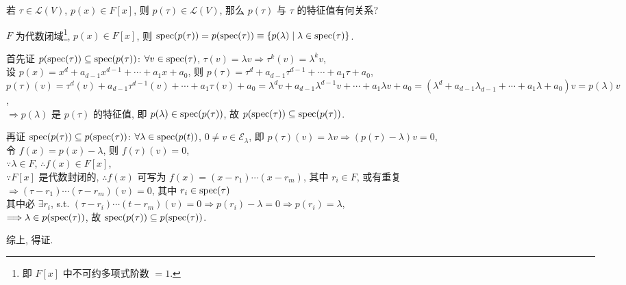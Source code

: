 \documentclass{note}
\begin{document}
若 $\tau\in\mathcal{L}(V)$, $p(x)\in F[x]$, 则 $p(\tau)\in\mathcal{L}(V)$, 那么 $p(\tau)$ 与 $\tau$ 的特征值有何关系?

\begin{thm}
    $F$ 为代数闭域\footnote{即 $F[x]$ 中不可约多项式阶数 $=1$.}, $p(x)\in F[x]$, 则 $\operatorname{spec}(p(\tau))=p(\operatorname{spec}(\tau))\equiv\{p(\lambda)\mid\lambda\in\operatorname{spec}(\tau)\}$.
\end{thm}
\begin{pf}
    首先证 $p(\operatorname{spec}(\tau))\subseteq\operatorname{spec}(p(\tau))$: $\forall v\in\operatorname{spec}(\tau)$, $\tau(v)=\lambda v\Longrightarrow\tau^k(v)=\lambda^kv$,\\
    设 $p(x)=x^d+a_{d-1}x^{d-1}+\cdots+a_1x+a_0$, 则 $p(\tau)=\tau^d+a_{d-1}\tau^{d-1}+\cdots+a_1\tau+a_0$,\\
    $p(\tau)(v)=\tau^d(v)+a_{d-1}\tau^{d-1}(v)+\cdots+a_1\tau(v)+a_0=\lambda^dv+a_{d-1}\lambda^{d-1}v+\cdots+a_1\lambda v+a_0=(\lambda^d+a_{d-1}\lambda_{d-1}+\cdots+a_1\lambda+a_0)v=p(\lambda)v$,\\
    $\Longrightarrow p(\lambda)$ 是 $p(\tau)$ 的特征值, 即 $p(\lambda)\in\operatorname{spec}(p(\tau))$, 故 $p(\operatorname{spec}(\tau))\subseteq\operatorname{spec}(p(\tau))$.

    再证 $\operatorname{spec}(p(\tau))\subseteq p(\operatorname{spec}(\tau))$: $\forall\lambda\in\operatorname{spec}(p(t))$, $0\neq v\in\mathcal{E}_{\lambda}$, 即 $p(\tau)(v)=\lambda v\Longrightarrow(p(\tau)-\lambda)v=0$,\\
    令 $f(x)=p(x)-\lambda$, 则 $f(\tau)(v)=0$,\\
    $\because\lambda\in F$, $\therefore f(x)\in F[x]$,\\
    $\because F[x]$ 是代数封闭的, $\therefore f(x)$ 可写为 $f(x)=(x-r_1)\cdots(x-r_m)$, 其中 $r_i\in F$, 或有重复\\
    $\Longrightarrow(\tau-r_1)\cdots(\tau-r_m)(v)=0$, 其中 $r_i\in\operatorname{spec}(\tau)$\\
    其中必 $\exists r_i$, s.t. $(\tau-r_i)\cdots(t-r_m)(v)=0\Longrightarrow p(r_i)-\lambda=0\Longrightarrow p(r_i)=\lambda$,\\
    $\Longrightarrow\lambda\in p(\operatorname{spec}(\tau))$, 故 $\operatorname{spec}(p(\tau))\subseteq p(\operatorname{spec}(\tau))$.

    综上, 得证.
\end{pf}

\end{document}
